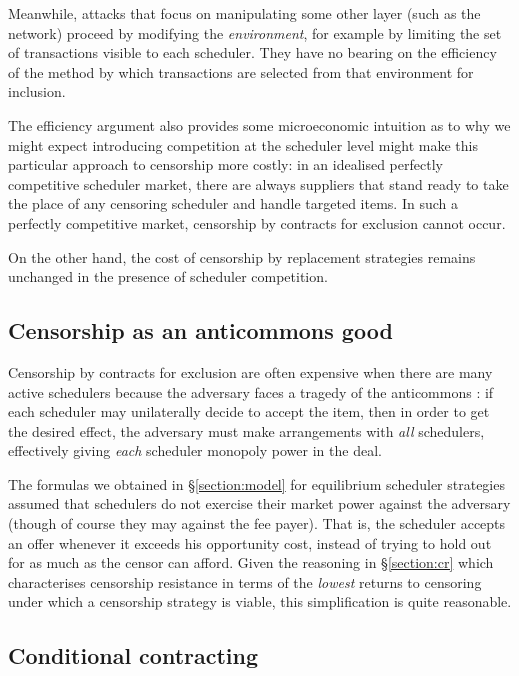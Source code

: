 Meanwhile, attacks that focus on manipulating some other layer (such as the network) proceed by modifying the \emph{environment}, for example by limiting the set of transactions visible to each scheduler.
%
They have no bearing on the efficiency of the method by which transactions are selected from that environment for inclusion.

The efficiency argument also provides some microeconomic intuition as to why we might expect introducing competition at the scheduler level might make this particular approach to censorship more costly: in an idealised perfectly competitive scheduler market, there are always suppliers that stand ready to take the place of any censoring scheduler and handle targeted items.
%
In such a perfectly competitive market, censorship by contracts for exclusion cannot occur.

On the other hand, the cost of censorship by replacement strategies remains unchanged in the presence of scheduler competition.

\subsection{Censorship as an anticommons good}

Censorship by contracts for exclusion are often expensive when there are many active schedulers because the adversary faces a tragedy of the anticommons \cite{heller1998tragedy}: if each scheduler may unilaterally decide to accept the item, then in order to get the desired effect, the adversary must make arrangements with \emph{all} schedulers, effectively giving \emph{each} scheduler monopoly power in the deal.

The formulas we obtained in \S\ref{section:model} for equilibrium scheduler strategies assumed that schedulers do not exercise their market power against the adversary (though of course they may against the fee payer).
%
That is, the scheduler accepts an offer whenever it exceeds his opportunity cost, instead of trying to hold out for as much as the censor can afford.
%
Given the reasoning in \S\ref{section:cr} which characterises censorship resistance in terms of the \emph{lowest} returns to censoring under which a censorship strategy is viable, this simplification is quite reasonable.


\subsection{Conditional contracting}

